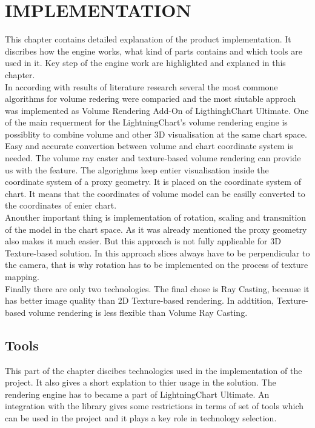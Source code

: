 \documentclass[twoside, english, 11pt]{report}
\begin{document}
\chapter{IMPLEMENTATION}
This chapter contains detailed explanation of the product implementation. It discribes how the engine works, what kind of parts contains and which tools are used in it. Key step of the engine work are highlighted and explaned in this chapter.\\

In according with results of literature research several the most commone algorithms for volume redering were comparied and the most siutable approch was implemented as Volume Rendering Add-On of LigthinghChart Ultimate. One of the main requerment for the LightningChart's volume rendering engine is possiblity to combine volume and other 3D visualisation at the same chart space. Easy and accurate convertion between volume and chart coordinate system is needed. The volume ray caster and texture-based volume rendering can provide us with the feature. The algorighms keep entier visualisation inside the coordinate system of a proxy geometry. It is placed on the coordinate system of chart. It means that the coordinates of volume model can be easilly converted to the coordinates of enier chart.\\

Anouther important thing is implementation of rotation, scaling and transmition of the model in the chart space. As it was already mentioned the proxy geometry also makes it much easier. But this approach is not fully applieable for 3D Texture-based solution. In this approach slices always have to be perpendicular to the camera, that is why rotation has to be implemented on the process of texture mapping.\\

Finally there are only two technologies. The final chose is Ray Casting, because it has better image quality than 2D Texture-based rendering. In addtition, Texture-based volume rendering is less flexible than Volume Ray Casting.
\section{Tools}
This part of the chapter discibes technologies used in the implementation of the project. It also gives a short explation to thier usage in the solution. The rendering engine has to became a part of LightningChart Ultimate. An integration with the library gives some restrictions in terms of set of tools which can be used in the project and it plays a key role in technology selection.
\end{document}
